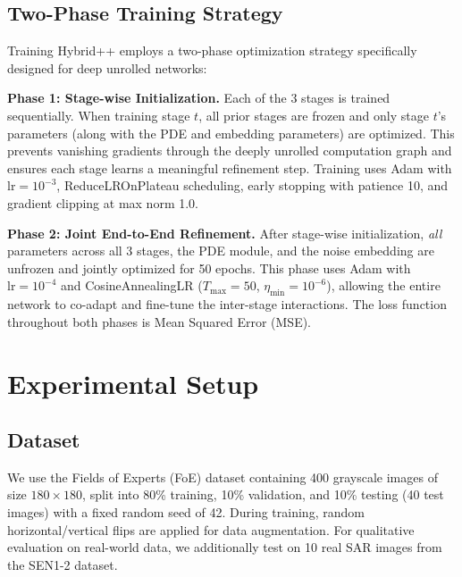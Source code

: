 \documentclass[conference]{IEEEtran}
\begin{document}
\subsection{Two-Phase Training Strategy}
\label{sec:training}
Training Hybrid++ employs a two-phase optimization strategy specifically designed for deep unrolled networks:

\textbf{Phase 1: Stage-wise Initialization.} Each of the 3 stages is trained sequentially. When training stage $t$, all prior stages are frozen and only stage $t$'s parameters (along with the PDE and embedding parameters) are optimized. This prevents vanishing gradients through the deeply unrolled computation graph and ensures each stage learns a meaningful refinement step. Training uses Adam with $\text{lr}=10^{-3}$, ReduceLROnPlateau scheduling, early stopping with patience 10, and gradient clipping at max norm 1.0.

\textbf{Phase 2: Joint End-to-End Refinement.} After stage-wise initialization, \textit{all} parameters across all 3 stages, the PDE module, and the noise embedding are unfrozen and jointly optimized for 50 epochs. This phase uses Adam with $\text{lr}=10^{-4}$ and CosineAnnealingLR ($T_{\max}{=}50$, $\eta_{\min}{=}10^{-6}$), allowing the entire network to co-adapt and fine-tune the inter-stage interactions. The loss function throughout both phases is Mean Squared Error (MSE).

\section{Experimental Setup}
\subsection{Dataset}
We use the Fields of Experts (FoE) dataset containing 400 grayscale images of size $180{\times}180$, split into 80\% training, 10\% validation, and 10\% testing (40 test images) with a fixed random seed of 42. During training, random horizontal/vertical flips are applied for data augmentation. For qualitative evaluation on real-world data, we additionally test on 10 real SAR images from the SEN1-2 dataset.
\end{document}
